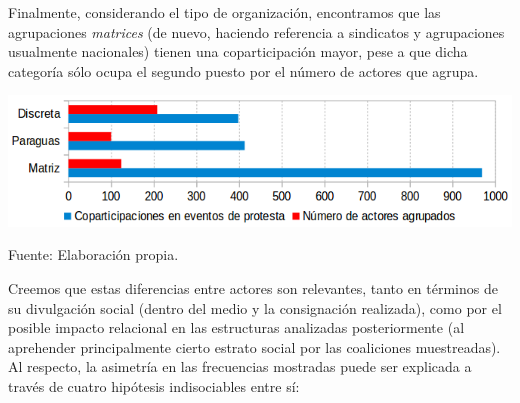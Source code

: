 \documentclass[letterpaper, 11pt]{book}
\theoremstyle{definition}
\theoremstyle{remark}
\begin{document}
Finalmente, considerando el tipo de organización, encontramos que las agrupaciones \emph{matrices} (de nuevo, haciendo referencia a sindicatos y agrupaciones usualmente nacionales) tienen una coparticipación mayor, pese a que dicha categoría sólo ocupa el segundo puesto por el número de actores que agrupa.

\begin{minipage}{\linewidth}
\centering
{} \label{3.16_epsTipoOrg}
\includegraphics[scale=0.50]{img/3.16_epsTipoOrg.png}
\par\bigskip
\small Fuente: Elaboración propia.
\end{minipage}\bigskip


Creemos que estas diferencias entre actores son relevantes, tanto en términos de su divulgación social (dentro del medio y la consignación realizada), como por el posible impacto relacional en las estructuras analizadas posteriormente (al aprehender principalmente cierto estrato social por las coaliciones muestreadas). 
Al respecto, la asimetría en las frecuencias mostradas puede ser explicada a través de cuatro hipótesis indisociables entre sí: 
\end{document}
